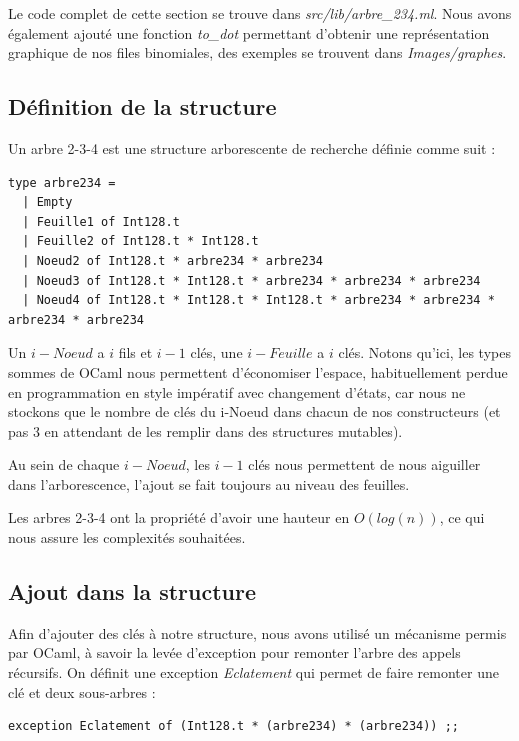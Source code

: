 \documentclass[12pt,a4paper]{article}
\begin{document}
Le code complet de cette section se trouve dans \textit{src/lib/arbre\_234.ml}. Nous avons également ajouté une fonction \textit{to\_dot} permettant d'obtenir une représentation graphique de nos files binomiales, des exemples se trouvent dans \textit{Images/graphes}.

\subsection{Définition de la structure}
Un arbre 2-3-4 est une structure arborescente de recherche définie comme suit :

\bigskip \begin{lstlisting}
type arbre234 = 
  | Empty
  | Feuille1 of Int128.t
  | Feuille2 of Int128.t * Int128.t
  | Noeud2 of Int128.t * arbre234 * arbre234 
  | Noeud3 of Int128.t * Int128.t * arbre234 * arbre234 * arbre234 
  | Noeud4 of Int128.t * Int128.t * Int128.t * arbre234 * arbre234 * arbre234 * arbre234 
\end{lstlisting} \bigskip 

Un $i-Noeud$ a $i$ fils et $i - 1$ clés, une $i-Feuille$ a $i$ clés. Notons qu'ici, les types sommes de OCaml nous permettent d'économiser l'espace, habituellement perdue en programmation en style impératif avec changement d'états, car nous ne stockons que le nombre de clés du i-Noeud dans chacun de nos constructeurs (et pas 3 en attendant de les remplir dans des structures mutables). 

Au sein de chaque $i-Noeud$, les $i-1$ clés nous permettent de nous aiguiller dans l'arborescence, l'ajout se fait toujours au niveau des feuilles.

Les arbres 2-3-4 ont la propriété d'avoir une hauteur en $O(log (n))$, ce qui nous assure les complexités souhaitées.


\subsection{Ajout dans la structure}
Afin d'ajouter des clés à notre structure, nous avons utilisé un mécanisme permis par OCaml, à savoir la levée d'exception pour remonter l'arbre des appels récursifs. On définit une exception \textit{Eclatement} qui permet de faire remonter une clé et deux sous-arbres :

\bigskip \begin{lstlisting}
exception Eclatement of (Int128.t * (arbre234) * (arbre234)) ;;
\end{lstlisting} \bigskip
\end{document}
